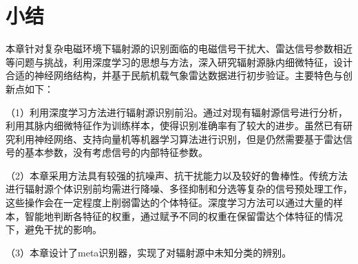 
\section{小结}
本章针对复杂电磁环境下辐射源的识别面临的电磁信号干扰大、雷达信号参数相近等问题与挑战，利用深度学习的思想与方法，深入研究辐射源脉内细微特征，设计合适的神经网络结构，并基于民航机载气象雷达数据进行初步验证。主要特色与创新点如下：

（1）利用深度学习方法进行辐射源识别前沿。通过对现有辐射源信号进行分析，利用其脉内细微特征作为训练样本，使得识别准确率有了较大的进步。虽然已有研究利用神经网络、支持向量机等机器学习算法进行识别，但是仍然需要基于雷达信号的基本参数，没有考虑信号的内部特征参数。

（2）本章采用方法具有较强的抗噪声、抗干扰能力以及较好的鲁棒性。传统方法进行辐射源个体识别前均需进行降噪、多径抑制和分选等复杂的信号预处理工作，这些操作会在一定程度上削弱雷达的个体特征。深度学习方法可以通过大量的样本，智能地判断各特征的权重，通过赋予不同的权重在保留雷达个体特征的情况下，避免干扰的影响。

（3）本章设计了meta识别器，实现了对辐射源中未知分类的辨别。
